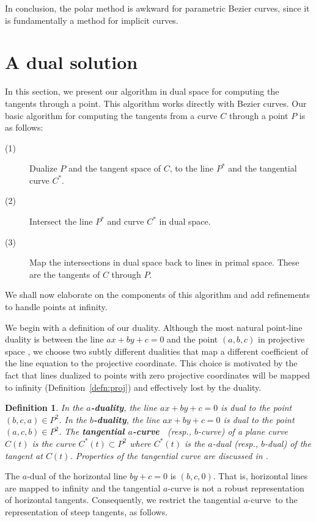 \documentclass[twocolumn,10pt]{article}
\newcommand{\atang}{tangential $a$-curve\ }
\newtheorem{defn2}[theorem]{Definition}
\begin{document}
In conclusion, the polar method is awkward for parametric Bezier curves, 
since it is fundamentally a method for implicit curves.

\section{A dual solution}
\label{sec:point}

In this section, we present our algorithm in dual space
for computing the tangents through a point.
This algorithm works directly with Bezier curves.
Our basic algorithm for computing the tangents from a curve $C$ through
a point $P$ is as follows:
%
\begin{description}
\item[(1)]	Dualize $P$ and the tangent space of $C$, to the line $P^*$
		and the tangential curve $C^*$.
\item[(2)]	Intersect the line $P^*$ and curve $C^*$ in dual space.
\item[(3)]	Map the intersections in dual space back to lines in primal space.
		These are the tangents of $C$ through $P$.
\end{description}
%
We shall now elaborate on the components of this algorithm
and add refinements to handle points at infinity.

We begin with a definition of our duality.
Although the most natural point-line duality is between the line $ax+by+c=0$
and the point $(a,b,c)$ in projective space \cite{fulton69}, %
we choose two subtly different dualities
that map a different coefficient of the line equation to the projective coordinate.
This choice is motivated by the fact that lines dualized 
to points with zero projective coordinates
will be mapped to infinity (Definition~\ref{defn:proj}) and effectively lost by the duality.
%
\begin{defn2}
In the {\bf $a$-duality}, the line $ax+by+c=0$ is dual to the point $(b,c,a) \in P^2$.
In the {\bf $b$-duality}, the line $ax+by+c=0$ is dual to the point $(a,c,b) \in P^2$.
The {\bf \atang}  (resp., $b$-curve) of a plane curve $C(t)$
is the curve $C^*(t) \subset P^2$ where $C^*(t)$ is the $a$-dual
(resp., $b$-dual) of the tangent at $C(t)$.
Properties of the tangential curve are discussed in \cite{jj00}.
\end{defn2}

The $a$-dual of the horizontal line $by+c=0$ is $(b,c,0)$.
That is, horizontal lines are mapped to infinity
and the tangential $a$-curve is not a robust representation of horizontal tangents.
Consequently, we restrict the \atang to the representation of steep tangents, as follows.
\end{document}
